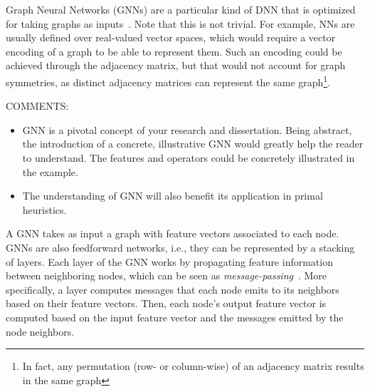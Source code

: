 Graph Neural Networks (GNNs) are a particular kind of DNN that is optimized for taking graphs as inputs~\cite{sanchez-lengelingGentleIntroductionGraph2021}.
Note that this is not trivial.
For example, NNs are usually defined over real-valued vector spaces, which would require a vector encoding of a graph to be able to represent them.
Such an encoding could be achieved through the adjacency matrix, but that would not account for graph symmetries, as distinct adjacency matrices can represent the same graph\footnote{In fact, any permutation (row- or column-wise) of an adjacency matrix results in the same graph}.

\color{red}
COMMENTS:
\begin{itemize}
\item GNN is a pivotal concept of your research and dissertation. Being abstract, the introduction of a concrete, illustrative GNN would greatly help the reader to understand. The features and operators could be concretely illustrated in the example.

\item The understanding of GNN will also benefit its application in primal heuristics.
\end{itemize}
\color{black}

A GNN takes as input a graph with feature vectors associated to each node.
GNNs are also feedforward networks, i.e., they can be represented by a stacking of layers.
Each layer of the GNN works by propagating feature information between neighboring nodes, which can be seen as \emph{message-passing}~\cite{gilmerNeuralMessagePassing2017}.
More specifically, a layer computes messages that each node emits to its neighbors based on their feature vectors.
Then, each node's output feature vector is computed based on the input feature vector and the messages emitted by the node neighbors.

